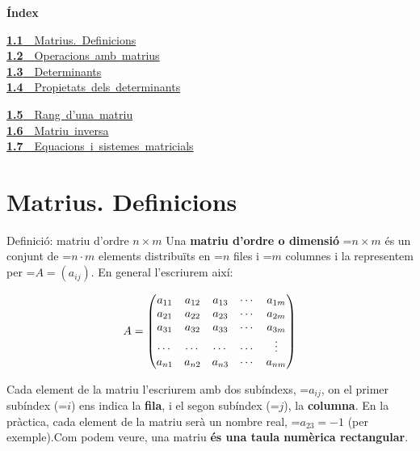 \documentclass[11pt,a4paper]{article}
\newcommand{\fmm}[1]{\setbox0=\hbox{$#1$}\ifdim\wd0>\linewidth\fmdisp{#1}\else\mbox{\box0}\fi}
\newcommand{\fmdisp}[1]{\[\setbox2=\hbox{$\displaystyle #1$}\ifdim\wd2>\linewidth\resizebox{\linewidth}{!}{\box2}\else\box2\fi\]}
\newcommand{\fmuline}[1]{\textbf{\color{fmaccent}#1}}
\begin{document}
\begin{tcolorbox}[colback=fmsurface,colframe=fmsurface,arc=3mm,left=4mm,right=4mm,top=2mm,bottom=2mm]
\small\textbf{Índex}\par\smallskip
\begin{minipage}[t]{0.49\linewidth}\small \mbox{\hyperlink{sec1}{\textbf{\color{fmgreen}1.1}\ \ Matrius. Definicions}}\\[3pt]
\mbox{\hyperlink{sec2}{\textbf{\color{fmgreen}1.2}\ \ Operacions amb matrius}}\\[3pt]
\mbox{\hyperlink{sec3}{\textbf{\color{fmgreen}1.3}\ \ Determinants}}\\[3pt]
\mbox{\hyperlink{sec4}{\textbf{\color{fmgreen}1.4}\ \ Propietats dels determinants}}\\[3pt]\end{minipage}\hfill\begin{minipage}[t]{0.49\linewidth}\small \mbox{\hyperlink{sec5}{\textbf{\color{fmgreen}1.5}\ \ Rang d'una matriu}}\\[3pt]
\mbox{\hyperlink{sec6}{\textbf{\color{fmgreen}1.6}\ \ Matriu inversa}}\\[3pt]
\mbox{\hyperlink{sec7}{\textbf{\color{fmgreen}1.7}\ \ Equacions i sistemes matricials}}\\[3pt]\end{minipage}
\end{tcolorbox}

\section{Matrius. Definicions}\hypertarget{sec1}{}

\begin{fmdef}{Definició: matriu d'ordre $n\times m$}
Una \textbf{matriu d'ordre o dimensió} \fmm{n\times m} és un conjunt de \fmm{n\cdot m} elements distribuïts en \fmm{n} files i \fmm{m} columnes i la representem per \fmm{A=(a_{ij})}. En general l'escriurem així:

\fmdisp{A=\begin{pmatrix} a_{11} & a_{12} & a_{13} & \cdots & a_{1m}\\ a_{21} & a_{22} & a_{23} & \cdots & a_{2m}\\ a_{31} & a_{32} & a_{33} & \cdots & a_{3m}\\ \cdots & \cdots & \cdots & \cdots & \vdots\\ a_{n1} & a_{n2} & a_{n3} & \cdots & a_{nm}\end{pmatrix}}

Cada element de la matriu l'escriurem amb dos subíndexs, \fmm{a_{ij}}, on el primer subíndex (\fmm{i}) ens indica la \textbf{fila}, i el segon subíndex (\fmm{j}), la \textbf{columna}. En la pràctica, cada element de la matriu serà un nombre real, \fmm{a_{23}=-1} (per exemple).\newline Com podem veure, una matriu \fmuline{és una taula numèrica rectangular}.
\end{fmdef}
\end{document}
